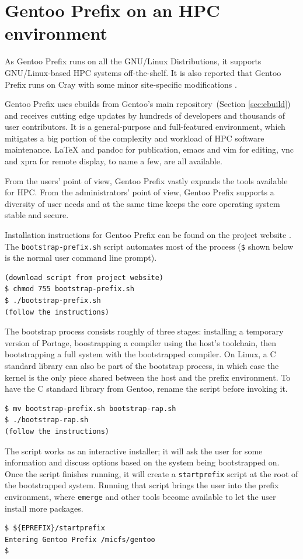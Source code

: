 \documentclass[a4paper,conference]{IEEEtran}
\begin{document}

\section{Gentoo Prefix on an HPC environment}
As Gentoo Prefix runs on all the GNU/Linux Distributions, it supports
GNU/Linux-based HPC systems off-the-shelf. It is also reported that
Gentoo Prefix runs on Cray with some minor site-specific modifications
\cite{cray}.

Gentoo Prefix uses ebuilds from Gentoo's main repository~(Section
\ref{sec:ebuild}) and receives cutting edge updates by hundreds of
developers and thousands of user contributors. It is a general-purpose
and full-featured environment, which mitigates a big portion of the
complexity and workload of HPC software maintenance. \LaTeX{} and
pandoc for publication, emacs and vim for editing, vnc and xpra for
remote display, to name a few, are all available.

From the users' point of view, Gentoo Prefix vastly expands the tools
available for HPC. From the administrators' point of view, Gentoo
Prefix supports a diversity of user needs and at the same time keeps the
core operating system stable and secure.

Installation instructions for Gentoo Prefix can be found on the project
website \cite{gentoo:prefix}. The \texttt{bootstrap-prefix.sh} script
automates most of the process (\texttt{\$} shown below is the normal
user command line prompt).
\begin{verbatim}
(download script from project website)
$ chmod 755 bootstrap-prefix.sh
$ ./bootstrap-prefix.sh
(follow the instructions)
\end{verbatim}

The bootstrap process consists roughly of three stages: installing a
temporary version of Portage, boostrapping a compiler using the host's
toolchain, then bootstrapping a full system with the bootstrapped
compiler. On Linux, a C standard library can also be part of the
bootstrap process, in which case the kernel is the only piece shared
between the host and the prefix environment.  To have the C standard
library from Gentoo, rename the script before invoking it.
\begin{verbatim}
$ mv bootstrap-prefix.sh bootstrap-rap.sh
$ ./bootstrap-rap.sh
(follow the instructions)
\end{verbatim}

The script works as an interactive installer; it will ask the user for
some information and discuss options based on the system being
bootstrapped on. Once the script finishes running, it will create a
\texttt{startprefix} script at the root of the bootstrapped system.
Running that script brings the user into the prefix environment, where
\texttt{emerge} and other tools become available to let the user install
more packages.
\begin{verbatim}
$ ${EPREFIX}/startprefix
Entering Gentoo Prefix /micfs/gentoo
$
\end{verbatim}
\end{document}
